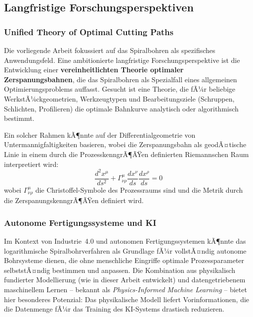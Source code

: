 ﻿\documentclass[12pt,a4paper]{article}
\begin{document}
\subsection{Langfristige Forschungsperspektiven}

\subsubsection{Unified Theory of Optimal Cutting Paths}

Die vorliegende Arbeit fokussiert auf das Spiralbohren als spezifisches Anwendungsfeld. Eine ambitionierte langfristige Forschungsperspektive ist die Entwicklung einer \textbf{vereinheitlichten Theorie optimaler Zerspanungsbahnen}, die das Spiralbohren als Spezialfall eines allgemeinen Optimierungsproblems auffasst. Gesucht ist eine Theorie, die fÃ¼r beliebige WerkstÃ¼ckgeometrien, Werkzeugtypen und Bearbeitungsziele (Schruppen, Schlichten, Profilieren) die optimale Bahnkurve analytisch oder algorithmisch bestimmt.

Ein solcher Rahmen kÃ¶nnte auf der Differentialgeometrie von Untermannigfaltigkeiten basieren, wobei die Zerspanungsbahn als geodÃ¤tische Linie in einem durch die ProzesskenngrÃ¶ÃŸen definierten Riemannschen Raum interpretiert wird:
\begin{equation}
    \frac{d^2 x^\mu}{ds^2} + \Gamma^\mu_{\nu\rho} \frac{dx^\nu}{ds} \frac{dx^\rho}{ds} = 0
\end{equation}
wobei $\Gamma^\mu_{\nu\rho}$ die Christoffel-Symbole des Prozessraums sind und die Metrik durch die ZerspanungskenngrÃ¶ÃŸen definiert wird.

\subsubsection{Autonome Fertigungssysteme und KI}

Im Kontext von Industrie~4.0 und autonomen Fertigungssystemen kÃ¶nnte das logarithmische Spiralbohrverfahren als Grundlage fÃ¼r vollstÃ¤ndig autonome Bohrsysteme dienen, die ohne menschliche Eingriffe optimale Prozessparameter selbststÃ¤ndig bestimmen und anpassen. Die Kombination aus physikalisch fundierter Modellierung (wie in dieser Arbeit entwickelt) und datengetriebenem maschinellem Lernen -- bekannt als \textit{Physics-Informed Machine Learning} -- bietet hier besonderes Potenzial: Das physikalische Modell liefert Vorinformationen, die die Datenmenge fÃ¼r das Training des KI-Systems drastisch reduzieren.
\end{document}
